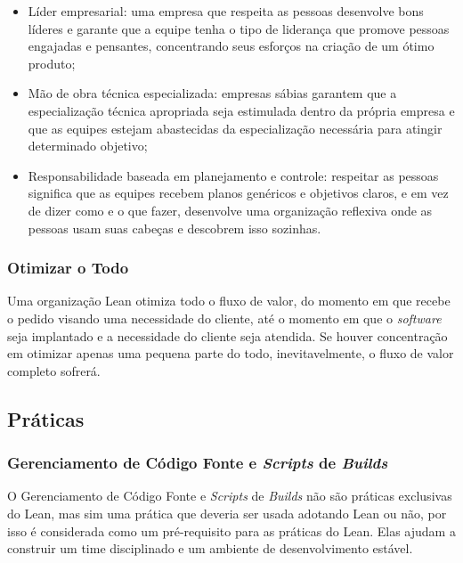 \begin{itemize}
\item Líder empresarial: uma empresa que respeita as pessoas desenvolve bons líderes e garante que a equipe tenha o tipo de liderança que promove pessoas engajadas e pensantes, concentrando seus esforços na criação de um ótimo produto;
\item Mão de obra técnica especializada: empresas sábias garantem que a especialização técnica apropriada seja estimulada dentro da própria empresa e que as equipes estejam abastecidas da especialização necessária para atingir determinado objetivo;
\item Responsabilidade baseada em planejamento e controle: respeitar as pessoas significa que as equipes recebem planos genéricos e objetivos claros, e em vez de dizer como e o que fazer, desenvolve uma organização reflexiva onde as pessoas usam suas cabeças e descobrem isso sozinhas.
\end{itemize}

\subsubsection[Otimizar o Todo]{Otimizar o Todo}

Uma organização Lean otimiza todo o fluxo de valor, do momento em que recebe o pedido visando uma necessidade do cliente, até o momento em que o \textit{software} seja implantado e a necessidade do cliente seja atendida. Se houver concentração em otimizar apenas uma pequena parte do todo, inevitavelmente, o fluxo de valor completo sofrerá. 

\subsection[ Práticas]{ Práticas}

\subsubsection[Gerenciamento de Código Fonte e \textit{Scripts} de \textit{Builds}]{Gerenciamento de Código Fonte e \textit{Scripts} de \textit{Builds}}

O Gerenciamento de Código Fonte e \textit{Scripts} de \textit{Builds} não são práticas exclusivas do Lean, mas sim uma prática que deveria ser usada adotando Lean ou não, por isso é considerada como um pré-requisito para as práticas do Lean. Elas ajudam a construir um time disciplinado e um ambiente de desenvolvimento estável.

